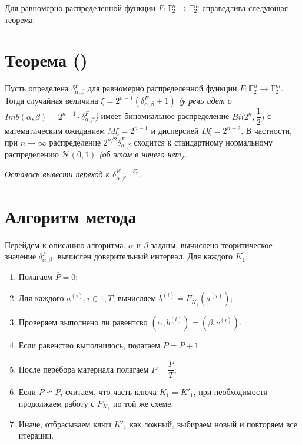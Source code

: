 \documentclass[utf8x, 14pt]{G7-32} %
\begin{document}
Для равномерно распределенной функции $F :\mathbb{F}_2^n \to \mathbb{F}_2^m$ справедлива следующая теорема:
\section{Теорема (\cite{Daemen})}\label{theorem}

 Пусть определена $\delta_{\alpha, \beta}^{F}$ для равномерно распределенной функции $F: \mathbb{F}_2^n \to \mathbb{F}_2^m$. Тогда случайная величина $\xi = 2^{n-1}(\delta_{\alpha, \beta}^{F}+1)$ \textit{(у \cite{Daemen} речь идет о $Imb(\alpha, \beta) = 2^{n-1}\cdot\delta_{\alpha, \beta}^{F}$)}  имеет биномиальное распределение $Bi\big(2^n, \dfrac{1}{2}\big)$ с математическим ожиданием $M\xi = 2^{n-1}$ и дисперсией $D\xi = 2^{n-2}$. В частности, при $n\to\infty$ распределение $2^{n/2}\delta_{\alpha, \beta}^{F}$ сходится к стандартному нормальному распределению $\mathcal{N}(0,1)$ \textit{(об этом в \cite{Daemen} ничего нет)}.

\textit{Осталось вывести переход к $\delta_{\alpha, \beta}^{F_1, ..., F_r}$. }

\section{Алгоритм метода}
Перейдем к описанию алгоритма. $\alpha$ и $\beta$ заданы, вычислено теоритическое значение $\delta_{\alpha, \beta}^F$, вычислен доверительный интервал. Для каждого $K_1^{'}$:

\begin{enumerate}
    \item Полагаем $\overline{P} = 0$;
    \item Для каждого $a^{(i)}, i\in\overline{1,T}$, вычисляем $b^{(i)} = F_{K_1^{'}}(a^{(i)})$; 
    \item Проверяем выполнено ли равентсво $(\alpha, b^{(i)}) = (\beta, c^{(i)})$. 
    \item Если равенство выполнилось, полагаем $\overline{P} = \overline{P} + 1$
    \item После перебора материала полагаем $\overline{P} = \dfrac{\overline{P}}{T}$;
    \item Если $\overline{P} \backsimeq P$, считаем, что часть ключа $K_1 = K'_1$, при необходимости продолжаем работу с $F_{K_2}$ по той же схеме.
    \item Иначе, отбрасываем ключ $K'_1$ как ложный, выбираем новый и повторяем все итерации.
\end{enumerate}
\end{document}
